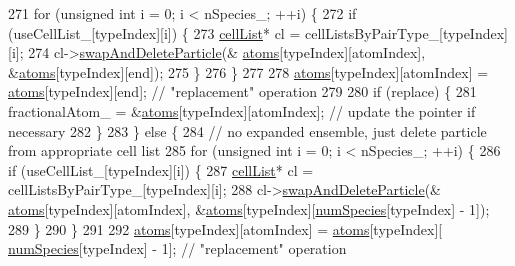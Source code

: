 \begin{DoxyCode}
271                     \textcolor{keywordflow}{for} (\textcolor{keywordtype}{unsigned} \textcolor{keywordtype}{int} i = 0; i < nSpecies\_; ++i) \{
272                         \textcolor{keywordflow}{if} (useCellList\_[typeIndex][i]) \{
273                             \hyperlink{classcell_list}{cellList}* cl = cellListsByPairType\_[typeIndex][i];
274                             cl->\hyperlink{classcell_list_a31caca1e8dd05c33215ac7495d55aeea}{swapAndDeleteParticle}(&
      \hyperlink{classsim_system_a90421b19082f7fb8fc23b7264b1161e4}{atoms}[typeIndex][atomIndex], &\hyperlink{classsim_system_a90421b19082f7fb8fc23b7264b1161e4}{atoms}[typeIndex][end]);
275                         \}
276                     \}
277 
278                     \hyperlink{classsim_system_a90421b19082f7fb8fc23b7264b1161e4}{atoms}[typeIndex][atomIndex] = \hyperlink{classsim_system_a90421b19082f7fb8fc23b7264b1161e4}{atoms}[typeIndex][end];    \textcolor{comment}{// "replacement"
       operation}
279 
280                     \textcolor{keywordflow}{if} (replace) \{
281                         fractionalAtom\_ = &\hyperlink{classsim_system_a90421b19082f7fb8fc23b7264b1161e4}{atoms}[typeIndex][atomIndex];    \textcolor{comment}{// update the pointer if
       necessary}
282                     \}
283                 \} \textcolor{keywordflow}{else} \{
284                     \textcolor{comment}{// no expanded ensemble, just delete particle from appropriate cell list}
285                     \textcolor{keywordflow}{for} (\textcolor{keywordtype}{unsigned} \textcolor{keywordtype}{int} i = 0; i < nSpecies\_; ++i) \{
286                         \textcolor{keywordflow}{if} (useCellList\_[typeIndex][i]) \{
287                             \hyperlink{classcell_list}{cellList}* cl = cellListsByPairType\_[typeIndex][i];
288                             cl->\hyperlink{classcell_list_a31caca1e8dd05c33215ac7495d55aeea}{swapAndDeleteParticle}(&
      \hyperlink{classsim_system_a90421b19082f7fb8fc23b7264b1161e4}{atoms}[typeIndex][atomIndex], &\hyperlink{classsim_system_a90421b19082f7fb8fc23b7264b1161e4}{atoms}[typeIndex][\hyperlink{classsim_system_a9eea865e6dc1cff377b1e79c4d9c23f0}{numSpecies}[typeIndex] - 1]);
289                         \}
290                     \}
291 
292                     \hyperlink{classsim_system_a90421b19082f7fb8fc23b7264b1161e4}{atoms}[typeIndex][atomIndex] = \hyperlink{classsim_system_a90421b19082f7fb8fc23b7264b1161e4}{atoms}[typeIndex][
      \hyperlink{classsim_system_a9eea865e6dc1cff377b1e79c4d9c23f0}{numSpecies}[typeIndex] - 1];    \textcolor{comment}{// "replacement" operation}

\end{DoxyCode}
